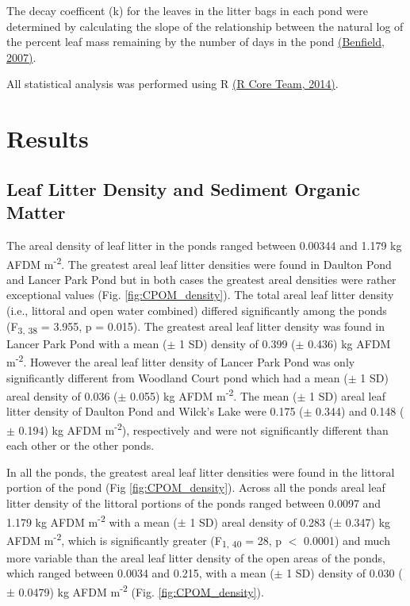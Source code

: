 \documentclass[12pt,letter]{article}
\begin{document}
The decay coefficent (k) for the leaves in the litter bags in each pond were determined by calculating the slope of the relationship between the natural log of the percent leaf mass remaining by the number of days in the pond \hyperref[csl:33]{(Benfield, 2007)}.

All statistical analysis was performed using R \hyperref[csl:34]{({R Core Team}, 2014)}.



\section{Results}
\subsection{Leaf Litter Density and Sediment Organic Matter}

The areal density of leaf litter in the ponds ranged between 0.00344 and 1.179 kg AFDM m\textsuperscript{-2}. The greatest areal leaf litter densities were found in Daulton Pond and Lancer Park Pond but in both cases the greatest areal densities were rather exceptional values (Fig. \ref{fig:CPOM_density}). The total areal leaf litter density (i.e., littoral and open water combined) differed significantly among the ponds (F\textsubscript{3, 38} = 3.955, p = 0.015). The greatest areal leaf litter density was found in Lancer Park Pond with a mean ($\pm$ 1 SD) density of 0.399 ($\pm$ 0.436) kg AFDM m\textsuperscript{-2}. However the areal leaf litter density of Lancer Park Pond was only significantly different from Woodland Court pond which had a mean ($\pm$ 1 SD) areal density of 0.036 ($\pm$ 0.055) kg AFDM m\textsuperscript{-2}. The mean ($\pm$ 1 SD) areal leaf litter density of Daulton Pond and Wilck's Lake were 0.175 ($\pm$ 0.344) and 0.148 ($\pm$ 0.194) kg AFDM m\textsuperscript{-2}), respectively and were not significantly different than each other or the other ponds. 

In all the ponds, the greatest areal leaf litter densities were found in the littoral portion of the pond (Fig \ref{fig:CPOM_density}). Across all the ponds areal leaf litter density of the littoral portions of the ponds ranged between 0.0097 and 1.179 kg AFDM m\textsuperscript{-2} with a mean ($\pm$ 1 SD) areal density of 0.283 ($\pm$ 0.347) kg AFDM m\textsuperscript{-2}, which is significantly greater (F\textsubscript{1, 40} = 28, p $<$ 0.0001) and much more variable than the areal leaf litter density of the open areas of the ponds, which ranged between 0.0034 and 0.215, with a mean ($\pm$ 1 SD) density of 0.030 ($\pm$ 0.0479) kg AFDM m\textsuperscript{-2} (Fig. \ref{fig:CPOM_density}). 
\end{document}
